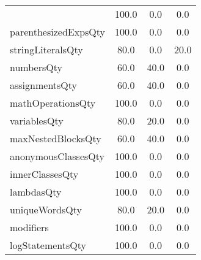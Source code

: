 \begin{tabular}{lccc}
{tryCatchQty & 100.0 & 0.0 & 0.0 \\
parenthesizedExpsQty & 100.0 & 0.0 & 0.0 \\
stringLiteralsQty & 80.0 & 0.0 & 20.0 \\
numbersQty & 60.0 & 40.0 & 0.0 \\
assignmentsQty & 60.0 & 40.0 & 0.0 \\
mathOperationsQty & 100.0 & 0.0 & 0.0 \\
variablesQty & 80.0 & 20.0 & 0.0 \\
maxNestedBlocksQty & 60.0 & 40.0 & 0.0 \\
anonymousClassesQty & 100.0 & 0.0 & 0.0 \\
innerClassesQty & 100.0 & 0.0 & 0.0 \\
lambdasQty & 100.0 & 0.0 & 0.0 \\
uniqueWordsQty & 80.0 & 20.0 & 0.0 \\
modifiers & 100.0 & 0.0 & 0.0 \\
logStatementsQty & 100.0 & 0.0 & 0.0 \\
\bottomrule
              \end{tabular}
            